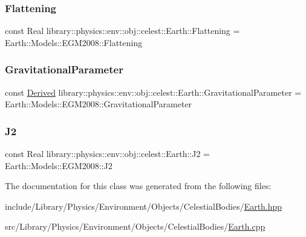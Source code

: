 \subsubsection{\texorpdfstring{Flattening}{Flattening}}
{\footnotesize\ttfamily const Real library\+::physics\+::env\+::obj\+::celest\+::\+Earth\+::\+Flattening = Earth\+::\+Models\+::\+E\+G\+M2008\+::\+Flattening\hspace{0.3cm}{\ttfamily [static]}}

\mbox{\label{classlibrary_1_1physics_1_1env_1_1obj_1_1celest_1_1_earth_ab0600740956e984ea7a548a062d793f1}} 
\subsubsection{\texorpdfstring{Gravitational\+Parameter}{GravitationalParameter}}
{\footnotesize\ttfamily const \hyperlink{classlibrary_1_1physics_1_1units_1_1_derived}{Derived} library\+::physics\+::env\+::obj\+::celest\+::\+Earth\+::\+Gravitational\+Parameter = Earth\+::\+Models\+::\+E\+G\+M2008\+::\+Gravitational\+Parameter\hspace{0.3cm}{\ttfamily [static]}}

\mbox{\label{classlibrary_1_1physics_1_1env_1_1obj_1_1celest_1_1_earth_a1a72d6717f224aad24853666d50fb8a1}} 
\subsubsection{\texorpdfstring{J2}{J2}}
{\footnotesize\ttfamily const Real library\+::physics\+::env\+::obj\+::celest\+::\+Earth\+::\+J2 = Earth\+::\+Models\+::\+E\+G\+M2008\+::\+J2\hspace{0.3cm}{\ttfamily [static]}}



The documentation for this class was generated from the following files\+:\begin{DoxyCompactItemize}
\item 
include/\+Library/\+Physics/\+Environment/\+Objects/\+Celestial\+Bodies/\hyperlink{_objects_2_celestial_bodies_2_earth_8hpp}{Earth.\+hpp}\item 
src/\+Library/\+Physics/\+Environment/\+Objects/\+Celestial\+Bodies/\hyperlink{_objects_2_celestial_bodies_2_earth_8cpp}{Earth.\+cpp}\end{DoxyCompactItemize}
